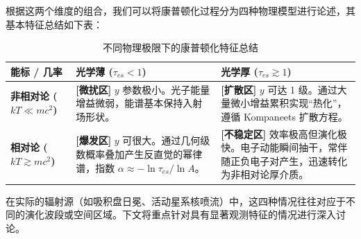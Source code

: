 根据这两个维度的组合，我们可以将康普顿化过程分为四种物理模型进行论述，其基本特征总结如下表：

\begin{table}[H]
\centering
\caption{不同物理极限下的康普顿化特征总结}
\renewcommand{\arraystretch}{1.5}
\begin{tabular}{|m{2.5cm}|m{5.5cm}|m{5.5cm}|}
\hline
\textbf{能标 / 几率} & \textbf{光学薄 ($\tau_{es} < 1$)} & \textbf{光学厚 ($\tau_{es} \gtrsim 1$)} \\ \hline
\textbf{非相对论 ($kT \ll mc^2$)} & \textbf{[微扰区]} $y$ 参数极小。光子能量增益微弱，能谱基本保持入射场形状。 & \textbf{[扩散区]} $y$ 可达 1 级。通过大量微小增益累积实现“热化”，遵循 Kompaneets 扩散方程。 \\ \hline
\textbf{相对论 ($kT \gtrsim mc^2$)} & \textbf{[爆发区]} $y$ 可很大。通过几何级数概率叠加产生反直觉的幂律谱，指数 $\alpha \approx -\ln \tau_{es} / \ln A$。 & \textbf{[不稳定区]} 效率极高但演化极快。电子动能瞬间抽干，常伴随正负电子对产生，迅速转化为非相对论厚介质。 \\ \hline
\end{tabular}
\end{table}
在实际的辐射源（如吸积盘日冕、活动星系核喷流）中，这四种情况往往对应于不同的演化波段或空间区域。下文将重点针对具有显著观测特征的情况进行深入讨论。
